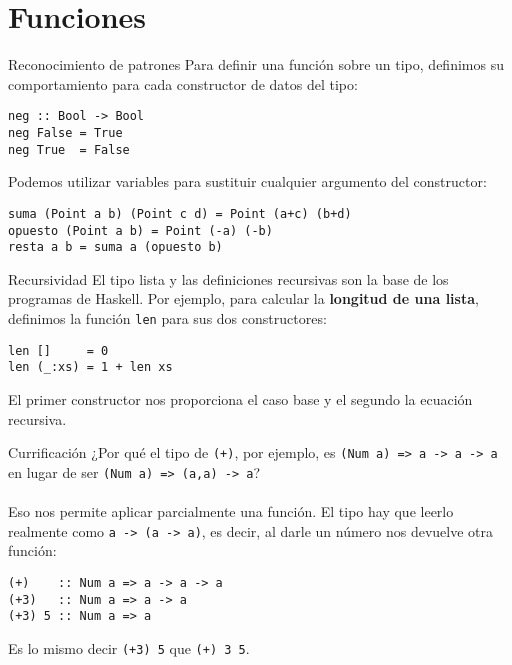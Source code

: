 \section{Funciones}

\begin{frame}[fragile]{Reconocimiento de patrones}
  Para definir una función sobre un tipo, definimos su comportamiento para cada
  constructor de datos del tipo:

  \espacio

  \begin{lstlisting}
neg :: Bool -> Bool
neg False = True
neg True  = False
  \end{lstlisting}

  \espacio
  
  Podemos utilizar variables para sustituir cualquier argumento del constructor:

  \espacio

  \begin{lstlisting}
suma (Point a b) (Point c d) = Point (a+c) (b+d)
opuesto (Point a b) = Point (-a) (-b)
resta a b = suma a (opuesto b)
  \end{lstlisting}
\end{frame}

\begin{frame}[fragile]{Recursividad}
  El tipo lista y las definiciones recursivas son la base de los programas de Haskell.
  Por ejemplo, para calcular la \textbf{longitud de una lista}, definimos la función
  \texttt{len} para sus dos constructores:

  \espacio

  \begin{lstlisting}
len []     = 0
len (_:xs) = 1 + len xs
  \end{lstlisting}

    \espacio

  El primer constructor nos proporciona el caso base y el segundo la ecuación recursiva.
\end{frame}

\begin{frame}[fragile]{Currificación}
  ¿Por qué el tipo de \texttt{(+)}, por ejemplo, es \texttt{(Num a) => a -> a -> a} en lugar de
  ser \texttt{(Num a) => (a,a) -> a}?
  \\~\\
  Eso nos permite aplicar parcialmente una función. El tipo hay que leerlo realmente como
  \texttt{a -> (a -> a)}, es decir, al darle un número nos devuelve otra función:
    \begin{lstlisting}
(+)    :: Num a => a -> a -> a
(+3)   :: Num a => a -> a
(+3) 5 :: Num a => a
  \end{lstlisting}
  Es lo mismo decir \texttt{(+3) 5} que \texttt{(+) 3 5}.
\end{frame}


